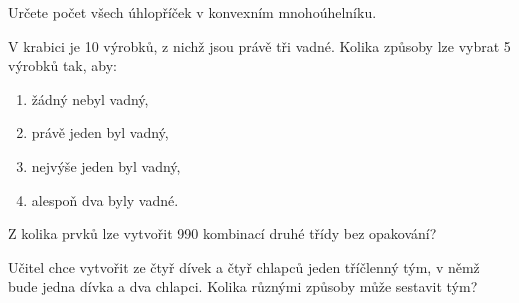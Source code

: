 \begin{exercise}\label{exercise:ch02_10}
    Určete počet všech úhlopříček v konvexním mnohoúhelníku. \citep[str. 147]{Petakova2020}
\end{exercise}
\begin{exercise}\label{exercise:ch02_11}
    V krabici je 10 výrobků, z nichž jsou právě tři vadné. Kolika způsoby lze vybrat 5 výrobků tak, aby:
    \begin{enumerate}[label=(\alph*)]
        \item žádný nebyl vadný,
        \item právě jeden byl vadný,
        \item nejvýše jeden byl vadný,
        \item alespoň dva byly vadné.
    \end{enumerate}
    \citep[str. 147]{Petakova2020}
\end{exercise}
\begin{exercise}\label{exercise:ch02_12}
    Z kolika prvků lze vytvořit 990 kombinací druhé třídy bez opakování? \citep[str. 147]{Petakova2020}
\end{exercise}
\begin{exercise}\label{exercise:ch02_13}
    Učitel chce vytvořit ze čtyř dívek a čtyř chlapců jeden tříčlenný tým, v němž bude jedna dívka a dva chlapci. Kolika různými způsoby může sestavit tým? \citep[příklad \emph{Tříčlenné 69274}]{hackmath2022}
\end{exercise}